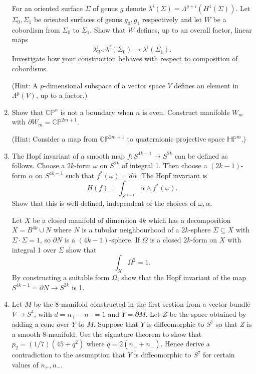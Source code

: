 \documentclass{article}
\theoremstyle{definition}
\newcommand{\CP}{\mathbb{CP}}
\newcommand{\HP}{\mathbb{HP}}
\begin{document}
\begin{enumerate}
        For an oriented surface $\Sigma$ of genus $g$ denote
        $\lambda^i(\Sigma)=\Lambda^{g+i}(H^1(\Sigma))$. Let $\Sigma_0,\Sigma_1$
        be oriented surfaces of genus $g_0,g_1$ respectively and let $W$ be a
        cobordism from $\Sigma_0$ to $\Sigma_1$. Show that $W$ defines, up to an
        overall factor, linear maps
        \begin{equation*}
            \lambda^i_W:\lambda^i(\Sigma_0)\to\lambda^i(\Sigma_1).
        \end{equation*}
        Investigate how your construction behaves with respect to composition of
        cobordisms.

        (Hint: A $p$-dimensional subspace of a vector space $V$ defines an
        element in $\Lambda^p(V)$, up to a factor.)

    \item Show that $\CP^n$ is not a boundary when $n$ is even. Construct
        manifolds $W_m$ with $\partial W_m=\CP^{2m+1}$.

        (Hint: Consider a map from $\CP^{2m+1}$ to quaternionic projective space
        $\HP^m$.)

    \item The Hopf invariant of a smooth map $f:S^{4k-1}\to S^{2k}$ can be
        defined as follows. Choose a $2k$-form $\omega$ on $S^{2k}$ of integral
        1. Then choose a $(2k-1)$-form $\alpha$ on $S^{4k-1}$ such that
        $f^*(\omega)=d\alpha$. The Hopf invariant is
        \begin{equation*}
            H(f) = \int_{S^{4k-1}}\alpha\wedge f^*(\omega).
        \end{equation*}
        Show that this is well-defined, independent of the choices of
        $\omega,\alpha$.

        Let $X$ be a closed manifold of dimension $4k$ which has a decomposition
        $X=B^{4k}\cup N$ where $N$ is a tubular neighbourhood of a $2k$-sphere
        $\Sigma\subseteq X$ with $\Sigma\cdot\Sigma=1$, so $\partial N$ is a
        $(4k-1)$-sphere. If $\Omega$ is a closed $2k$-form on $X$ with integral
        1 over $\Sigma$ show that
        \begin{equation*}
            \int_X\Omega^2=1.
        \end{equation*}
        By constructing a suitable form $\Omega$, show that the Hopf invariant
        of the map $S^{4k-1}=\partial N\to S^{2k}$ is 1.

    \item Let $M$ be the 8-manifold constructed in the first section from a
        vector bundle $V\to S^4$, with $d=n_+-n_-=1$ and $Y=\partial M$. Let $Z$
        be the space obtained by adding a cone over $Y$ to $M$. Suppose that $Y$
        is diffeomorphic to $S^7$ so that $Z$ is a smooth 8-manifold. Use the
        signature theorem to show that $p_2=(1/7)(45+q^2)$ where $q=2(n_++n_-)$.
        Hence derive a contradiction to the assumption that $Y$ is diffeomorphic
        to $S^7$ for certain values of $n_+,n_-$.


\end{enumerate}
\end{document}
